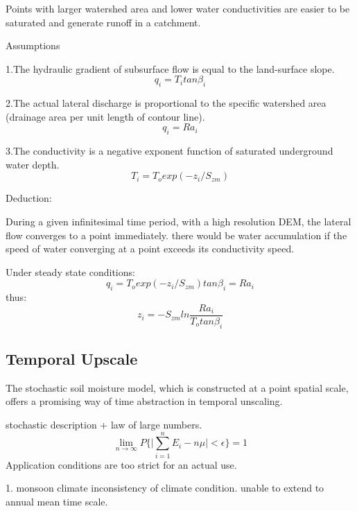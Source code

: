 \documentclass[11pt]{article}
\begin{document}
Points with larger watershed area and lower water conductivities are easier to be saturated and generate runoff in a catchment.

Assumptions

1.The hydraulic gradient of subsurface flow is equal to the land-surface slope.
\begin{equation}
q_i=T_itan\beta_i
\end{equation}

2.The actual lateral discharge is proportional to the specific watershed area (drainage area per unit length of
contour line).
\begin{equation}
q_i=Ra_i
\end{equation}

3.The conductivity is a negative exponent function of saturated underground water depth.
\begin{equation}
T_i=T_oexp(-z_i/S_{zm})
\end{equation}

Deduction:

During a given infinitesimal time period, with a high resolution DEM, the lateral flow converges to a point immediately. 
there would be water accumulation if the speed of water converging at a point exceeds its conductivity speed.

Under steady state conditions:
\begin{equation}
q_i=T_oexp(-z_i/S_{zm})tan\beta_i=Ra_i
\end{equation}
thus:
\begin{equation}
z_i=-S_{zm}ln\frac{Ra_i}{T_otan\beta_i}
\end{equation}
\begin{center}
\section{Temporal Upscale}
\end{center}


The stochastic soil moisture model, which is constructed at a point spatial scale,  offers a promising way of time abstraction in temporal unscaling. 

stochastic description + law of large numbers. 
\begin{equation}
\lim_{n\to\infty}P\lbrace\vert\sum_{i=1}^n E_i-n\mu\vert<\epsilon\rbrace=1
\end{equation}
Application conditions are too strict for an actual use.

1. monsoon climate inconsistency of climate condition. unable to extend to annual mean time scale.
\end{document}

